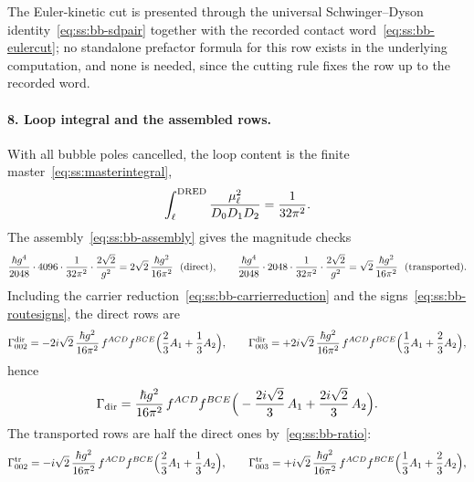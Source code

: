 \begin{remark}\label{rem:ss:bbeulercut}
The Euler-kinetic cut is presented through the universal Schwinger--Dyson
identity~\eqref{eq:ss:bb-sdpair} together with the recorded contact
word~\eqref{eq:ss:bb-eulercut}; no standalone prefactor formula for this row
exists in the underlying computation, and none is needed, since the cutting
rule fixes the row up to the recorded word.
\end{remark}

\paragraph{8. Loop integral and the assembled rows.} With all bubble poles
cancelled, the loop content is the finite master~\eqref{eq:ss:masterintegral},
\begin{equation}\label{eq:ss:bb-master}
\int_{\ell}^{\mathrm{DRED}}\frac{\mu_\ell^{2}}{D_0D_1D_2}=\frac{1}{32\pi^{2}}.
\end{equation}
The assembly~\eqref{eq:ss:bb-assembly} gives the magnitude checks
\begin{equation}\label{eq:ss:bb-magnitude}
\frac{\hbar g^{4}}{2048}\cdot4096\cdot\frac{1}{32\pi^{2}}\cdot\frac{2\sqrt2}{g^{2}}
=2\sqrt2\,\frac{\hbar g^{2}}{16\pi^{2}}\ \ (\mathrm{direct}),
\qquad
\frac{\hbar g^{4}}{2048}\cdot2048\cdot\frac{1}{32\pi^{2}}\cdot\frac{2\sqrt2}{g^{2}}
=\sqrt2\,\frac{\hbar g^{2}}{16\pi^{2}}\ \ (\mathrm{transported}).
\end{equation}
Including the carrier reduction~\eqref{eq:ss:bb-carrierreduction} and the
signs~\eqref{eq:ss:bb-routesigns}, the direct rows are
\begin{equation}\label{eq:ss:bb-rowsdir}
\Gamma_{002}^{\mathrm{dir}}
=-2i\sqrt2\,\frac{\hbar g^{2}}{16\pi^{2}}\,f^{ACD}f^{BCE}\Big(\frac23 A_1+\frac13 A_2\Big),
\qquad
\Gamma_{003}^{\mathrm{dir}}
=+2i\sqrt2\,\frac{\hbar g^{2}}{16\pi^{2}}\,f^{ACD}f^{BCE}\Big(\frac13 A_1+\frac23 A_2\Big),
\end{equation}
hence
\begin{equation}\label{eq:ss:bb-dirsum}
\Gamma_{\mathrm{dir}}
=\frac{\hbar g^{2}}{16\pi^{2}}\,f^{ACD}f^{BCE}
\Big(-\frac{2i\sqrt2}{3}\,A_1+\frac{2i\sqrt2}{3}\,A_2\Big).
\end{equation}
The transported rows are half the direct ones by~\eqref{eq:ss:bb-ratio}:
\begin{equation}\label{eq:ss:bb-rowstr}
\Gamma_{002}^{\mathrm{tr}}
=-i\sqrt2\,\frac{\hbar g^{2}}{16\pi^{2}}\,f^{ACD}f^{BCE}\Big(\frac23 A_1+\frac13 A_2\Big),
\qquad
\Gamma_{003}^{\mathrm{tr}}
=+i\sqrt2\,\frac{\hbar g^{2}}{16\pi^{2}}\,f^{ACD}f^{BCE}\Big(\frac13 A_1+\frac23 A_2\Big),
\end{equation}
